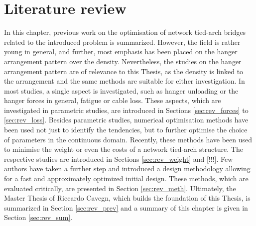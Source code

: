 \chapter{Literature review}\label{sec:review}
In this chapter, previous work on the optimisation of network tied-arch bridges related to the introduced problem is summarized. However, the field is rather young in general, and further, most emphasis has been placed on the hanger arrangement pattern over the density. Nevertheless, the studies on the hanger arrangement pattern are of relevance to this Thesis, as the density is linked to the arrangement and the same methods are suitable for either investigation. In most studies, a single aspect is investigated, such as hanger unloading or the hanger forces in general, fatigue or cable loss. These aspects, which are investigated in parametric studies, are introduced in Sections \ref{sec:rev_forces} to \ref{sec:rev_loss}. Besides parametric studies, numerical optimisation methods have been used not just to identify the tendencies, but to further optimise the choice of parameters in the continuous domain. Recently, these methods have been used to minimise the weight or even the costs of a network tied-arch structure. The respective studies are introduced in Sections \ref{sec:rev_weight} and [!!!]. Few authors have taken a further step and introduced a design methodology allowing for a fast and approximately optimized initial design. These methods, which are evaluated critically, are presented in Section \ref{sec:rev_meth}. Ultimately, the Master Thesis of Riccardo Cavegn, which builds the foundation of this Thesis, is summarized in Section \ref{sec:rev_prev} and a summary of this chapter is given in Section \ref{sec:rev_sum}.

